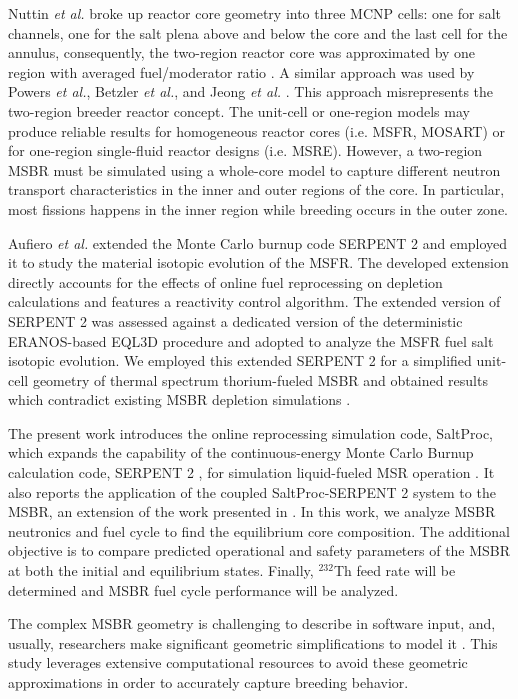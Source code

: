 Nuttin \emph{et al.} broke up reactor core geometry into three \gls{MCNP} cells: 
one for salt channels, one for the salt plena above and below the core and the 
last cell for the annulus, consequently, the two-region reactor core was 
approximated by one region with averaged fuel/moderator ratio 
\cite{nuttin_potential_2005}.  A similar approach was used by Powers \emph{et 
al.}, Betzler \emph{et al.}, and Jeong \emph{et al.} 
\cite{powers_new_2013,powers_inventory_2014,betzler_modeling_2016, 
betzler_molten_2017, jeong_development_2014, jeong_equilibrium_2016}. This approach 
misrepresents the two-region breeder reactor concept. The unit-cell or one-region 
models may produce reliable results for homogeneous reactor cores (i.e. 
\gls{MSFR}, \gls{MOSART}) or for one-region single-fluid reactor designs (i.e. 
\gls{MSRE}). However, a two-region \gls{MSBR} must be simulated using a whole-core 
model to capture different neutron transport characteristics in the inner and 
outer regions of the core. In particular, most fissions happens in the inner 
region while breeding occurs in the outer zone.  

Aufiero \emph{et al.} extended the Monte Carlo burnup code SERPENT 2 and 
employed it to study the material isotopic evolution of the \gls{MSFR}. The 
developed extension directly accounts for the effects of online fuel 
reprocessing on depletion calculations and features a reactivity control 
algorithm. The extended version of SERPENT 2 was assessed against a dedicated 
version of the deterministic ERANOS-based EQL3D procedure 
\cite{ruggieri_eranos_2006} and adopted to analyze the \gls{MSFR} fuel salt 
isotopic evolution. We employed this extended SERPENT 2 for a simplified 
unit-cell geometry of thermal spectrum thorium-fueled \gls{MSBR} and obtained 
results which contradict existing \gls{MSBR} depletion simulations 
\cite{jeong_equilibrium_2016}.

The present work introduces the online reprocessing simulation code, SaltProc, 
which expands the capability of the continuous-energy Monte Carlo Burnup 
calculation code, SERPENT 2 \cite{leppanen_serpent_2015-1}, for simulation 
liquid-fueled \gls{MSR} operation 
\cite{andrei_rykhlevskii_arfc/saltproc:_2018}. It also reports the 
application of the coupled SaltProc-SERPENT 2 system to the \gls{MSBR}, an 
extension of the work presented in 
\cite{rykhlevskii_full-core_2017, rykhlevskii_online_2017}. In this work, we 
analyze \gls{MSBR} neutronics and fuel cycle to find 
the equilibrium core composition. The additional objective 
is to compare predicted operational and safety parameters of the \gls{MSBR} at 
both the initial and equilibrium states. Finally, $^{232}$Th feed rate will be 
determined and \gls{MSBR} fuel cycle performance will be analyzed.

The complex \gls{MSBR} geometry is challenging to describe in software input, 
and, 
usually, researchers make significant geometric simplifications to model it 
\cite{park_whole_2015}. This study leverages extensive computational 
resources to avoid these geometric approximations in order to accurately capture 
breeding behavior. 
